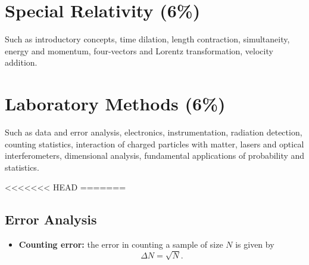 \documentclass[%
 reprint,
superscriptaddress,
 amsmath,amssymb,
 aps,
prc,
]{revtex4-1}
\begin{document}
\section{Special Relativity (6\%)}
Such as introductory concepts, time dilation, length contraction, simultaneity, energy and momentum, four-vectors and Lorentz transformation, velocity addition.

\section{Laboratory Methods (6\%)}
Such as data and error analysis, electronics, instrumentation, radiation detection, counting statistics, interaction of charged particles with matter, lasers and optical interferometers, dimensional analysis, fundamental applications of probability and statistics.

<<<<<<< HEAD
=======
\subsection{Error Analysis}
\begin{itemize}
	\item \textbf{Counting error:} the error in counting a sample of size $N$ is given by
	\begin{equation}
		\Delta N = \sqrt{N}.
	\end{equation}
\end{itemize}
\end{document}
